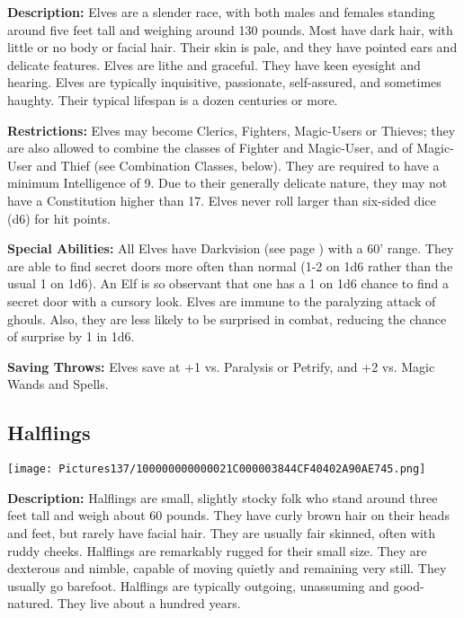 \documentclass[a4paper,twoside,openany,10pt]{book}
\begin{document}
\begin{multicols}{2}
\textbf{Description:}
Elves are a slender race, with both males and females standing around five feet tall and weighing around 130 pounds. Most have dark hair, with little or no body or facial hair. Their skin is pale, and they have pointed ears and delicate features. Elves are lithe and graceful. They have keen eyesight and hearing. Elves are typically inquisitive, passionate, self-assured, and sometimes haughty. Their typical lifespan is a dozen centuries or more.

\textbf{Restrictions: } Elves may become Clerics, Fighters, Magic-Users or Thieves; they are also allowed to combine the classes of Fighter and Magic-User, and of Magic-User and Thief (see Combination Classes, below). They are required to have a minimum Intelligence of 9. Due to their generally delicate nature, they may not have a Constitution higher than 17. Elves never roll larger than six-sided dice (d6) for hit points.

\textbf{Special Abilities: }All Elves have Darkvision (see page \hyperlink{darkvision}{\pageref{darkvision}}) with a 60'{} range. They are able to find secret doors more often than normal (1-2 on 1d6 rather than the usual 1 on 1d6). An Elf is so observant that one has a 1 on 1d6 chance to find a secret door with a cursory look. Elves are immune to the paralyzing attack of ghouls. Also, they are less likely to be surprised in combat, reducing the chance of surprise by 1 in 1d6.

\textbf{Saving Throws: } Elves save at +1 vs. Paralysis or Petrify, and
+2 vs. Magic Wands and Spells.

\subsection{Halflings}\label{halflings}

\begin{center}
	\texttt{[image: Pictures137/100000000000021C000003844CF40402A90AE745.png]}
\end{center}\medskip

\textbf{Description:}
Halflings are small, slightly stocky folk who stand around three feet tall and weigh about 60 pounds. They have curly brown hair on their heads and feet, but rarely have facial hair. They are usually fair skinned, often with ruddy cheeks. Halflings are remarkably rugged for their small size. They are dexterous and nimble, capable of moving quietly and remaining very still. They usually go barefoot. Halflings are typically outgoing, unassuming and good-natured. They live about a hundred years.


\end{multicols}
\end{document}
